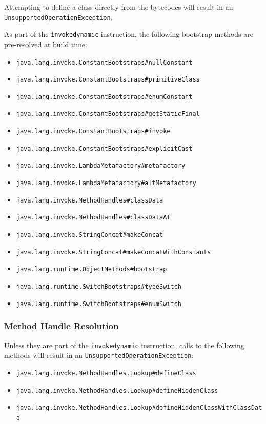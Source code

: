 Attempting to define a class directly from the bytecodes will result in an \texttt{UnsupportedOperationException}.

As part of the \texttt{ìnvokedynamic} instruction, the following bootstrap methods are pre-resolved at build time:
\begin{itemize}
    \item \texttt{java.lang.invoke.ConstantBootstraps\#nullConstant} 
    \item \texttt{java.lang.invoke.ConstantBootstraps\#primitiveClass} 
    \item \texttt{java.lang.invoke.ConstantBootstraps\#enumConstant} 
    \item \texttt{java.lang.invoke.ConstantBootstraps\#getStaticFinal} 
    \item \texttt{java.lang.invoke.ConstantBootstraps\#invoke} 
    \item \texttt{java.lang.invoke.ConstantBootstraps\#explicitCast} 
    \item \texttt{java.lang.invoke.LambdaMetafactory\#metafactory} 
    \item \texttt{java.lang.invoke.LambdaMetafactory\#altMetafactory} 
    \item \texttt{java.lang.invoke.MethodHandles\#classData} 
    \item \texttt{java.lang.invoke.MethodHandles\#classDataAt} 
    \item \texttt{java.lang.invoke.StringConcat\#makeConcat} 
    \item \texttt{java.lang.invoke.StringConcat\#makeConcatWithConstants} 
    \item \texttt{java.lang.runtime.ObjectMethods\#bootstrap} 
    \item \texttt{java.lang.runtime.SwitchBootstraps\#typeSwitch} 
    \item \texttt{java.lang.runtime.SwitchBootstraps\#enumSwitch}
\end{itemize}


\subsubsection{Method Handle Resolution}

Unless they are part of the \texttt{invokedynamic} instruction, calls to the following methods will result in an \texttt{UnsupportedOperationException}:
\begin{itemize}
    \item \texttt{java.lang.invoke.MethodHandles.Lookup\#defineClass} 
    \item \texttt{java.lang.invoke.MethodHandles.Lookup\#defineHiddenClass} 
    \item \texttt{java.lang.invoke.MethodHandles.Lookup\#defineHiddenClassWithClassData}
\end{itemize}


